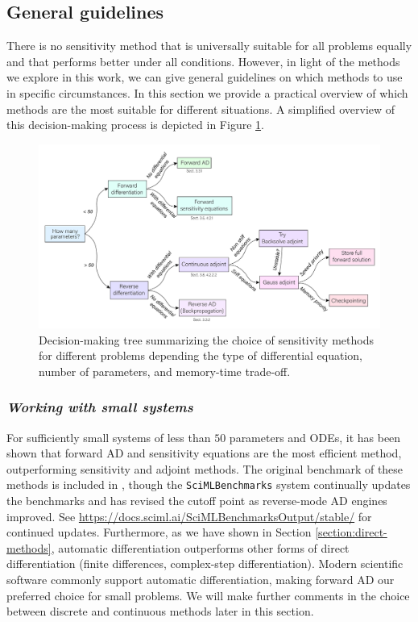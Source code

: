 \subsection{General guidelines}

There is no sensitivity method that is universally suitable for all problems equally and that performs better under all conditions. 
However, in light of the methods we explore in this work, we can give general guidelines on which methods to use in specific circumstances. In this section we provide a practical overview of which methods are the most suitable for different situations. 
A simplified overview of this decision-making process is depicted in Figure \ref{fig:roadmap}. 

\begin{figure}[tb]
    \centering
    \includegraphics[width=1\textwidth]{tex/figures/roadmap.pdf}
    \caption{Decision-making tree summarizing the choice of sensitivity methods for different problems depending the type of differential equation, number of parameters, and memory-time trade-off.}
    \label{fig:roadmap}
\end{figure}

\subsubsection*{\textit{Working with small systems}}

For sufficiently small systems of less than $50$ parameters and ODEs, it has been shown that forward AD and sensitivity equations are the most efficient method, outperforming sensitivity and adjoint methods. 
The original benchmark of these methods is included in \cite{ma2021comparison}, though the \texttt{SciMLBenchmarks} system continually updates the benchmarks and has revised the cutoff point as reverse-mode AD engines improved. 
See \url{https://docs.sciml.ai/SciMLBenchmarksOutput/stable/} for continued updates.
Furthermore, as we have shown in Section \ref{section:direct-methods}, automatic differentiation outperforms other forms of direct differentiation (finite differences, complex-step differentiation). 
Modern scientific software commonly support automatic differentiation, making forward AD our preferred choice for small problems. 
We will make further comments in the choice between discrete and continuous methods later in this section.

